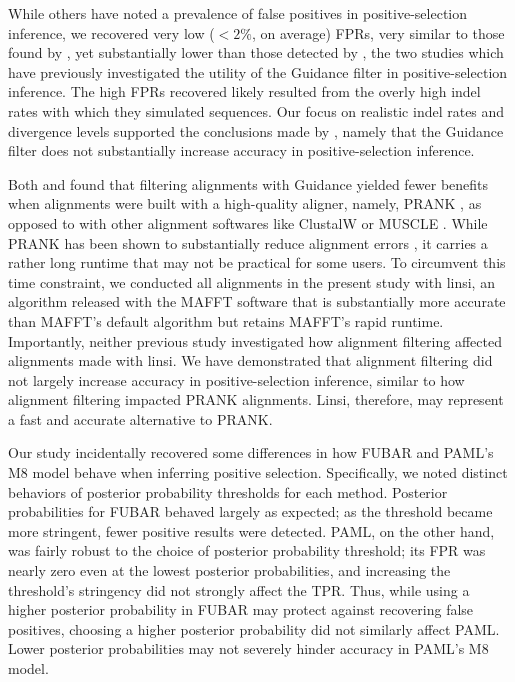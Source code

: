 \documentclass[11pt]{article}
\begin{document}
While others \citep{Schneider2009, Fletcher2010, MarkovaRaina2011,Privman2012} have noted a prevalence of false positives in positive-selection inference, we recovered very low ($<2\%$, on average) FPRs, very similar to those found by \citet{Jordan2012}, yet substantially lower than those detected by \citet{Privman2012}, the two studies which have previously investigated the utility of the Guidance filter in positive-selection inference. The high FPRs \citet{Privman2012} recovered likely resulted from the overly high indel rates with which they simulated sequences. Our focus on realistic indel rates and divergence levels supported the conclusions made by \citet{Jordan2012}, namely that the Guidance filter does not substantially increase accuracy in positive-selection inference.

Both \citet{Privman2012} and \citet{Jordan2012} found that filtering alignments with Guidance yielded fewer benefits when alignments were built with a high-quality aligner, namely, PRANK \citep{Loytynoja2008}, as opposed to with other alignment softwares like ClustalW \citep{Thompson1994} or MUSCLE \citep{Edgar2004}. While PRANK has been shown to substantially reduce alignment errors \citep{Loytynoja2008,Privman2012,Jordan2012}, it carries a rather long runtime that may not be practical for some users. To circumvent this time constraint, we conducted all alignments in the present study with linsi, an algorithm released with the MAFFT software that is substantially more accurate than MAFFT's default algorithm \citep{Katoh2005, Nuin2006, Thompson2011} but retains MAFFT's rapid runtime. Importantly, neither previous study investigated how alignment filtering affected alignments made with linsi. We have demonstrated that alignment filtering did not largely increase accuracy in positive-selection inference, similar to how alignment filtering impacted PRANK alignments. Linsi, therefore, may represent a fast and accurate alternative to PRANK.

Our study incidentally recovered some differences in how FUBAR and PAML's M8 model behave when inferring positive selection. Specifically, we noted distinct behaviors of posterior probability thresholds for each method. Posterior probabilities for FUBAR behaved largely as expected; as the threshold became more stringent, fewer positive results were detected. PAML, on the other hand, was fairly robust to the choice of posterior probability threshold; its FPR was nearly zero even at the lowest posterior probabilities, and increasing the threshold's stringency did not strongly affect the TPR. Thus, while using a higher posterior probability in FUBAR may protect against recovering false positives, choosing a higher posterior probability did not similarly affect PAML. Lower posterior probabilities may not severely hinder accuracy in PAML's M8 model.
\end{document}
